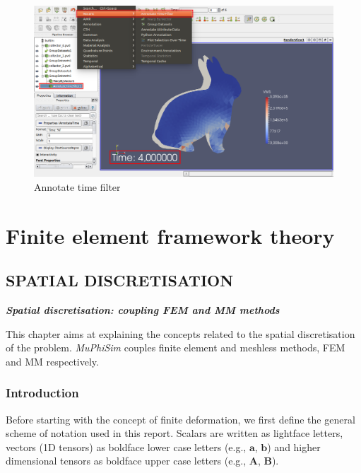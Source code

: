 \documentclass[oneside,11pt,times]{book}
\begin{document}
\begin{figure}[htb]
\centering
\includegraphics[width=1\textwidth]{imgs/Outputs/AnnotateTimeFilter.png}
\caption{Annotate time filter}
\label{figTime}
\end{figure}


\chapter{Finite element framework theory}
\section{SPATIAL DISCRETISATION} \label{sec:spatialDiscre}
\begin{center}
    \Large{\textbf{\textit{Spatial discretisation: coupling FEM and MM methods}}}\\[5mm]
\end{center}

This chapter aims at explaining the concepts related to the spatial discretisation of the problem. \textit{MuPhiSim} couples finite element and meshless methods, FEM and MM respectively.

\subsection{Introduction}

Before starting with the concept of finite deformation, we first define the general scheme of notation used in this report. Scalars are written as lightface letters, vectors (1D tensors) as boldface lower case letters (e.g., $\bm{a}$, $\bm{b}$) and higher dimensional tensors as boldface upper case letters (e.g., $\bm{A}$, $\bm{B}$).
\end{document}
